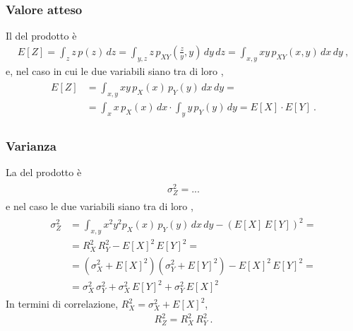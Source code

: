 \documentclass[letterpaper,10pt,italian]{jupyterBook}
\begin{document}
\subsubsection*{Valore atteso}

\sphinxAtStartPar
Il  del prodotto è
\begin{equation*}
\begin{split}E[Z] = \int_z z \, p(z) \, dz = \int_{y,z} z \, p_{XY}\left(\frac{z}{y},y\right) \, dy \, dz =  \int_{x,y} x y \, p_{XY}(x,y) \, dx \, dy \ , \end{split}
\end{equation*}
\sphinxAtStartPar
e, nel caso in cui le due variabili siano tra di loro ,
\begin{equation*}
\begin{split}\begin{aligned}
  E[Z]
  & = \int_{x,y} x y \, p_X(x) \, p_Y(y) \, dx \, dy = \\
  & = \int_{x} x \, p_X(x) \, dx \cdot \int_y y \, p_Y(y) \, dy = E[X] \cdot E[Y] \ .
\end{aligned}\end{split}
\end{equation*}\subsubsection*{Varianza}

\sphinxAtStartPar
La  del prodotto è
\begin{equation*}
\begin{split}\begin{aligned}
  \sigma_Z^2 = ...
\end{aligned}\end{split}
\end{equation*}
\sphinxAtStartPar
e nel caso le due variabili siano tra di loro ,
\begin{equation*}
\begin{split}\begin{aligned}
  \sigma_Z^2 
  & = \int_{x,y} x^2 y^2 p_X(x) \, p_Y(y) \, dx \, dy - \left( E[X] \, E[Y] \right)^2 = \\
  & = R_X^2 \, R_Y^2 - E[X]^2 \, E[Y]^2 = \\
  & = \left( \sigma_X^2 + E[X]^2 \right)\left( \sigma_Y^2 + E[Y]^2 \right) - E[X]^2 \, E[Y]^2 = \\
  & = \sigma_X^2 \, \sigma_Y^2 + \sigma_X^2 \, E[Y]^2 + \sigma_Y^2 \, E[X]^2
\end{aligned}\end{split}
\end{equation*}
\sphinxAtStartPar
In termini di correlazione, \(R_X^2 = \sigma_X^2 + E[X]^2\),
\begin{equation*}
\begin{split}R_Z^2 = R_X^2 \, R_Y^2 \ .\end{split}
\end{equation*}
\sphinxstepscope
\end{document}
